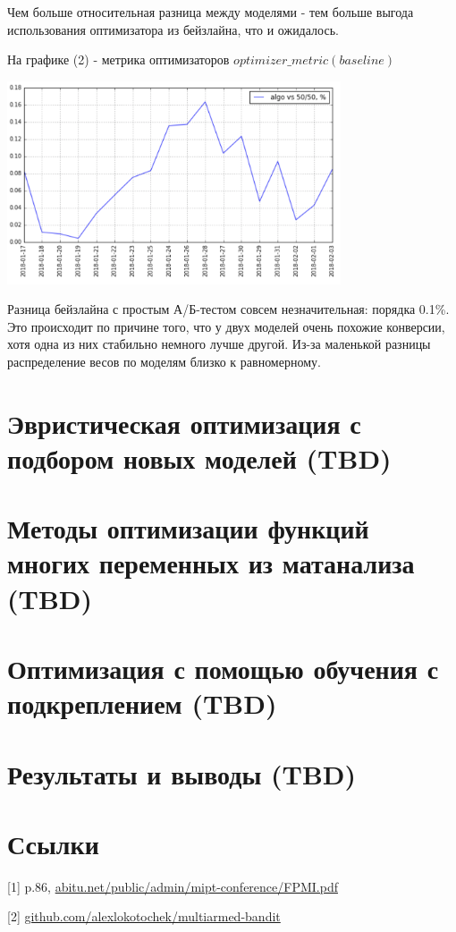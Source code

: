 \documentclass{article}
\begin{document}
\par
\vspace{3mm}

Чем больше относительная разница между моделями - тем больше выгода использования оптимизатора из бейзлайна, что и ожидалось.
\par
\vspace{3mm}

На графике (2) - метрика оптимизаторов $optimizer\_metric(baseline)$
\par
\vspace{3mm}

\includegraphics[height=6cm]{img2.png}
\par
\vspace{3mm}

Разница бейзлайна с простым А/Б-тестом совсем незначительная: порядка 0.1\%. Это происходит по причине того, что у двух моделей очень похожие конверсии, хотя одна из них стабильно немного лучше другой. Из-за маленькой разницы распределение весов по моделям близко к равномерному.

\par
\vspace{3mm}

\section{Эвристическая оптимизация с подбором новых моделей (TBD)}

\section{Методы оптимизации функций многих переменных из матанализа (TBD)}

\section{Оптимизация с помощью обучения с подкреплением (TBD)}

\section{Результаты и выводы (TBD)}


\section{Ссылки}

[1] p.86, \url{abitu.net/public/admin/mipt-conference/FPMI.pdf}


[2] \url{github.com/alexlokotochek/multiarmed-bandit}
\par
\vspace{3mm}
\end{document}
